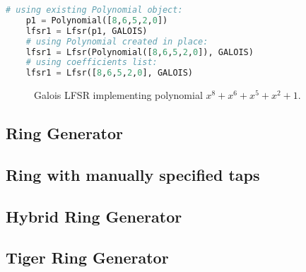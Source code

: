 \begin{lstlisting}[language=Python]
	# using existing Polynomial object:
	p1 = Polynomial([8,6,5,2,0])
	lfsr1 = Lfsr(p1, GALOIS)
	# using Polynomial created in place:
	lfsr1 = Lfsr(Polynomial([8,6,5,2,0]), GALOIS)
	# using coefficients list:
	lfsr1 = Lfsr([8,6,5,2,0], GALOIS)
\end{lstlisting}

\begin{figure}[h]
	\centering
	\scalebox{.75}{}
	\caption{Galois LFSR implementing polynomial $x^8+x^6+x^5+x^2+1$.}
	\label{lfsr:galois}
\end{figure}

\subsection{Ring Generator}


\subsection{Ring with manually specified taps}


\subsection{Hybrid Ring Generator}


\subsection{Tiger Ring Generator}

